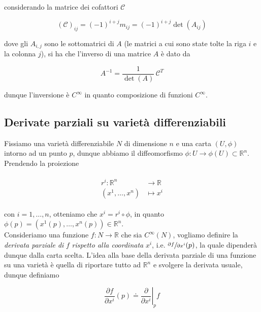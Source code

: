 considerando la matrice dei cofattori $ \mathcal{C} $

\begin{equation}
	(\mathcal{C})_{ij} = (-1)^{i+j} m_{ij} = (-1)^{i+j} \det(A_{ij})
\end{equation}

dove gli $ A_{i,j} $ sono le sottomatrici di $ A $ (le matrici a cui sono state tolte la riga $ i $ e la colonna $ j $), si ha che l'inverso di una matrice $ A $ è dato da

\begin{equation}
	A^{-1} = \dfrac{1}{\det(A)} \, \mathcal{C}^{T}
\end{equation}

dunque l'inversione è $ C^{\infty} $ in quanto composizione di funzioni $ C^{\infty} $.

\subsection{Derivate parziali su varietà differenziabili}

Fissiamo una varietà differenziabile $ N $ di dimensione $ n $ e una carta $ (U,\phi) $ intorno ad un punto $ p $, dunque abbiamo il diffeomorfismo $ \phi : U \to \phi(U) \subset \mathbb{R}^{n} $. Prendendo la proiezione

\begin{align}
	\begin{split}
		r^{i} : \mathbb{R}^{n} &\to \mathbb{R}\\
		(x^{1},\dots,x^{n}) &\mapsto x^{i}
	\end{split}
\end{align}

con $ i=1,\dots,n $, otteniamo che $ x^{i} = r^{i} \circ \phi $, in quanto $ \phi(p) = (x^{1}(p),\dots,x^{n}(p)) \in \mathbb{R}^{n} $.\\
Consideriamo una funzione $ f : N \to \mathbb{R} $ che sia $ C^{\infty}(N) $, vogliamo definire la \textit{derivata parziale di} $ f $ \textit{rispetto alla coordinata} $ x^{i} $, i.e. $ \sfrac{\partial f}{\partial x^{i}} (p) $, la quale dipenderà dunque dalla carta scelta. L'idea alla base della derivata parziale di una funzione su una varietà è quella di riportare tutto ad $ \mathbb{R}^{n} $ e svolgere la derivata usuale, dunque definiamo

\begin{equation}
	\dfrac{\partial f}{\partial x^{i}} (p) \doteq \left. \dfrac{\partial}{\partial x^{i}} \right|_{p} f
\end{equation}

